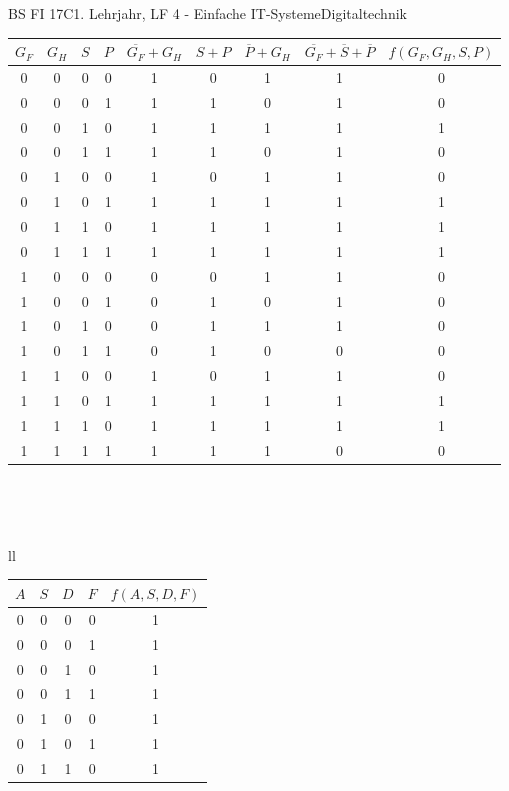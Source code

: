 \documentclass[oneside,openany,headings=optiontotoc,11pt,numbers=noenddot]{scrreprt}
\begin{document}
	\begin{worksheet}{BS FI 17C}{1. Lehrjahr, LF 4 - Einfache IT-Systeme}{Digitaltechnik}
		\begin{framed}
			\begin{tabularx}{0.95\textwidth}{c|c|c|c|c|c|c|c|c}
				\(G_F\) & \(G_H\) & \(S\) & \(P\) & \(\overline{G_F} + G_H\) & \(S + P\) & \(\overline{P} + G_H\) & \(\overline{G_F} + \overline{S} + \overline{P}\) & \(f(G_F,G_H,S,P)\)\\
				\hline
				0 & 0 & 0 & 0 & 1 & 0 & 1 & 1 & 0\\
				0 & 0 & 0 & 1 & 1 & 1 & 0 & 1 & 0\\
				0 & 0 & 1 & 0 & 1 & 1 & 1 & 1 & 1\\
				0 & 0 & 1 & 1 & 1 & 1 & 0 & 1 & 0\\
				0 & 1 & 0 & 0 & 1 & 0 & 1 & 1 & 0\\
				0 & 1 & 0 & 1 & 1 & 1 & 1 & 1 & 1\\
				0 & 1 & 1 & 0 & 1 & 1 & 1 & 1 & 1\\
				0 & 1 & 1 & 1 & 1 & 1 & 1 & 1 & 1\\
				1 & 0 & 0 & 0 & 0 & 0 & 1 & 1 & 0\\
				1 & 0 & 0 & 1 & 0 & 1 & 0 & 1 & 0\\
				1 & 0 & 1 & 0 & 0 & 1 & 1 & 1 & 0\\
				1 & 0 & 1 & 1 & 0 & 1 & 0 & 0 & 0\\
				1 & 1 & 0 & 0 & 1 & 0 & 1 & 1 & 0\\
				1 & 1 & 0 & 1 & 1 & 1 & 1 & 1 & 1\\
				1 & 1 & 1 & 0 & 1 & 1 & 1 & 1 & 1\\
				1 & 1 & 1 & 1 & 1 & 1 & 1 & 0 & 0
			\end{tabularx} \\
			\par\noindent\\
			\begin{tabular}{ll}
				\begin{tabularx}{0.45\textwidth}{c|c|c|c|c}
					\(A\) & \(S\) & \(D\) & \(F\) & \(f(A, S, D, F)\)\\
					\hline
					0 & 0 & 0 & 0 & 1\\
					0 & 0 & 0 & 1 & 1\\
					0 & 0 & 1 & 0 & 1\\
					0 & 0 & 1 & 1 & 1\\
					0 & 1 & 0 & 0 & 1\\
					0 & 1 & 0 & 1 & 1\\
					0 & 1 & 1 & 0 & 1\\

\end{tabularx}
\end{tabular}
\end{framed}
\end{worksheet}
\end{document}
